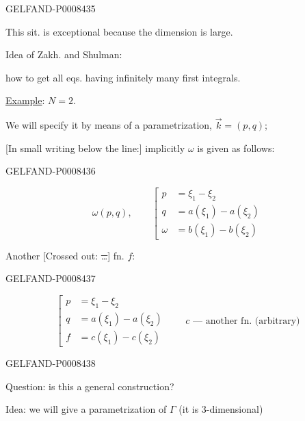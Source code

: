 \begin{GelfandAdjacentEvidence}{GELFAND-P000843}{5}

This sit. is exceptional because the dimension is large.

Idea of Zakh. and Shulman:

how to get all eqs. having infinitely many first integrals.

\uline{Example}: \quad \uline{\(N=2\)}.

We will specify it by means of a parametrization, \(\vec{k}=(p,q)\);

[In small writing below the line:] implicitly \(\omega\) is given as follows:
\end{GelfandAdjacentEvidence}
\begin{GelfandAdjacentEvidence}{GELFAND-P000843}{6}


\begin{equation*}
\omega(p,q),\qquad
\left[
\begin{aligned}
p&=\xi_1-\xi_2\\
q&=a(\xi_1)-a(\xi_2)\\
\omega&=b(\xi_1)-b(\xi_2)
\end{aligned}
\right.
\tag{2}
\end{equation*}

Another [Crossed out: \sout{…}] fn. \(f\):
\end{GelfandAdjacentEvidence}
\begin{GelfandAdjacentEvidence}{GELFAND-P000843}{7}


\begin{equation*}
\left[
\begin{aligned}
p&=\xi_1-\xi_2\\
q&=a(\xi_1)-a(\xi_2)\\
f&=c(\xi_1)-c(\xi_2)
\end{aligned}
\right.
\qquad c\text{ — another fn. (arbitrary)}
\tag{3}
\end{equation*}
\end{GelfandAdjacentEvidence}
\begin{GelfandAdjacentEvidence}{GELFAND-P000843}{8}


Question: is this a general construction?

Idea: we will give a parametrization of \(\Gamma\) (it is 3-dimensional)
\end{GelfandAdjacentEvidence}
